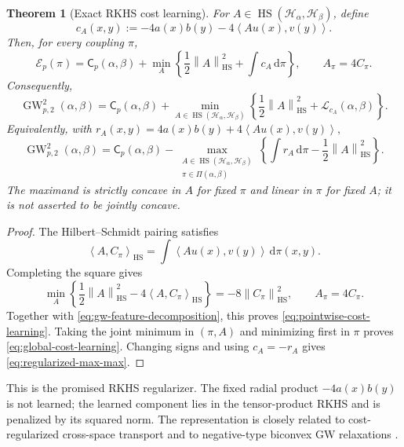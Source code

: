 \documentclass[11pt,a4paper]{article}
\newtheorem{theorem}{Theorem}[section]
\theoremstyle{definition}
\theoremstyle{remark}
\newcommand{\Hcal}{\mathcal H}
\newcommand{\Lcal}{\mathcal L}
\newcommand{\Ecal}{\mathcal E}
\newcommand{\Piopt}{\Pi}
\newcommand{\HS}{\operatorname{HS}}
\newcommand{\dd}{\,\mathrm d}
\newcommand{\norm}[1]{\left\lVert #1\right\rVert}
\newcommand{\ip}[2]{\left\langle #1,#2\right\rangle}
\newcommand{\GW}{\operatorname{GW}}
\begin{document}
\begin{theorem}[Exact RKHS cost learning]
\label{thm:exact-rkhs-cost-learning}
For \(A\in\HS(\Hcal_\alpha,\Hcal_\beta)\), define
\begin{equation}
  c_A(x,y):=-4a(x)b(y)-4\ip{Au(x)}{v(y)}.
  \label{eq:learned-cost}
\end{equation}
Then, for every coupling \(\pi\),
\begin{equation}
  \Ecal_p(\pi)
  =\mathsf C_p(\alpha,\beta)
   +\min_A\left\{
      \frac12\norm{A}_{\HS}^2+
      \int c_A\dd\pi
    \right\},
  \qquad
  A_\pi=4C_\pi.
  \label{eq:pointwise-cost-learning}
\end{equation}
Consequently,
\begin{equation}
  \GW_{p,2}^2(\alpha,\beta)
  =\mathsf C_p(\alpha,\beta)
   +\min_{A\in\HS(\Hcal_\alpha,\Hcal_\beta)}
    \left\{\frac12\norm{A}_{\HS}^2+
    \Lcal_{c_A}(\alpha,\beta)\right\}.
  \label{eq:global-cost-learning}
\end{equation}
Equivalently, with
\(
 r_A(x,y)=4a(x)b(y)+4\ip{Au(x)}{v(y)},
\)
\begin{equation}
  \GW_{p,2}^2(\alpha,\beta)
  =\mathsf C_p(\alpha,\beta)
  -\max_{\substack{A\in\HS(\Hcal_\alpha,\Hcal_\beta)\\
                     \pi\in\Piopt(\alpha,\beta)}}
   \left\{
     \int r_A\dd\pi-\frac12\norm{A}_{\HS}^2
   \right\}.
  \label{eq:regularized-max-max}
\end{equation}
The maximand is strictly concave in \(A\) for fixed \(\pi\) and linear in
\(\pi\) for fixed \(A\); it is not asserted to be jointly concave.
\end{theorem}

\begin{proof}
The Hilbert--Schmidt pairing satisfies
\[
  \ip{A}{C_\pi}_{\HS}
  =\int\ip{Au(x)}{v(y)}\dd\pi(x,y).
\]
Completing the square gives
\[
  \min_A\left\{
    \frac12\norm{A}_{\HS}^2-4\ip{A}{C_\pi}_{\HS}
  \right\}
  =-8\norm{C_\pi}_{\HS}^2,
  \qquad A_\pi=4C_\pi.
\]
Together with \eqref{eq:gw-feature-decomposition}, this proves
\eqref{eq:pointwise-cost-learning}.  Taking the joint minimum in \((\pi,A)\)
and minimizing first in \(\pi\) proves \eqref{eq:global-cost-learning}.
Changing signs and using \(c_A=-r_A\) gives
\eqref{eq:regularized-max-max}.
\end{proof}

This is the promised RKHS regularizer.  The fixed radial product
\(-4a(x)b(y)\) is not learned; the learned component lies in the
tensor-product RKHS and is penalized by its squared norm.  The representation
is closely related to cost-regularized cross-space transport
\citep{SebbouhCuturiPeyre2024} and to negative-type biconvex GW relaxations
\citep{Konno1976,SejourneVialardPeyre2021}.
\end{document}
